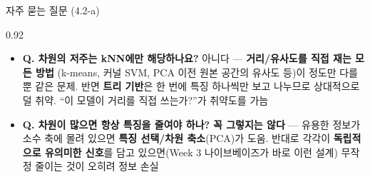 \begin{frame}{자주 묻는 질문 (4.2-a)}
\begin{center}\begin{varwidth}{0.92\textwidth}
  \small
  \begin{itemize}
    \item \textbf{Q. 차원의 저주는 kNN에만 해당하나요?}
      아니다 --- \textbf{거리/유사도를 직접 재는 모든 방법}
      (k-means, 커널 SVM, PCA 이전 원본 공간의 유사도 등)이
      정도만 다를 뿐 같은 문제. 반면 \textbf{트리 기반}은
      한 번에 특징 하나씩만 보고 나누므로 상대적으로 덜 취약.
      ``이 모델이 거리를 직접 쓰는가?''가 취약도를 가늠
    \item \textbf{Q. 차원이 많으면 항상 특징을 줄여야 하나?}
      \textbf{꼭 그렇지는 않다} --- 유용한 정보가 소수 축에
      몰려 있으면 \textbf{특징 선택/차원 축소}(PCA)가 도움.
      반대로 각각이 \textbf{독립적으로 유의미한 신호}를 담고
      있으면(Week 3 나이브베이즈가 바로 이런 설계) 무작정
      줄이는 것이 오히려 정보 손실
  \end{itemize}
\end{varwidth}\end{center}
\end{frame}
